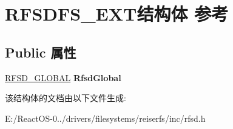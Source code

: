 \hypertarget{struct_r_f_s_d_f_s___e_x_t}{}\section{R\+F\+S\+D\+F\+S\+\_\+\+E\+X\+T结构体 参考}
\label{struct_r_f_s_d_f_s___e_x_t}
\subsection*{Public 属性}
\begin{DoxyCompactItemize}
\item 
\mbox{\label{struct_r_f_s_d_f_s___e_x_t_a6336eaad569aa079e08199bce7a2dab4}} 
\hyperlink{struct___r_f_s_d___g_l_o_b_a_l}{R\+F\+S\+D\+\_\+\+G\+L\+O\+B\+AL} {\bfseries Rfsd\+Global}
\end{DoxyCompactItemize}


该结构体的文档由以下文件生成\+:\begin{DoxyCompactItemize}
\item 
E\+:/\+React\+O\+S-\/0../drivers/filesystems/reiserfs/inc/rfsd.\+h\end{DoxyCompactItemize}
